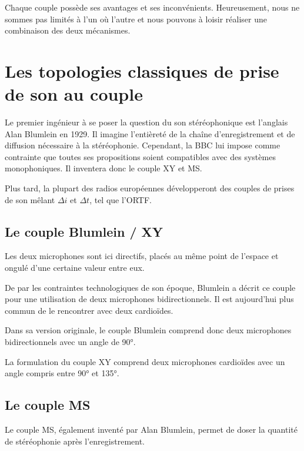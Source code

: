\documentclass[
]{book}
\begin{document}
Chaque couple possède ses avantages et ses inconvénients. Heureusement, nous ne sommes pas limités à l'un où l'autre et nous pouvons à loisir réaliser une combinaison des deux mécanismes.

\hypertarget{les-topologies-classiques-de-prise-de-son-au-couple}{%
\section{Les topologies classiques de prise de son au couple}\label{les-topologies-classiques-de-prise-de-son-au-couple}}

Le premier ingénieur à se poser la question du son stéréophonique est l'anglais Alan Blumlein en 1929. Il imagine l'entièreté de la chaîne d'enregistrement et de diffusion nécessaire à la stéréophonie. Cependant, la BBC lui impose comme contrainte que toutes ses propositions soient compatibles avec des systèmes monophoniques. Il inventera donc le couple XY et MS.

Plus tard, la plupart des radios européennes développeront des couples de prises de son mêlant \(\Delta i\) et \(\Delta t\), tel que l'ORTF.

\hypertarget{le-couple-blumlein-xy}{%
\subsection{Le couple Blumlein / XY}\label{le-couple-blumlein-xy}}

Les deux microphones sont ici directifs, placés au même point de l'espace et ongulé d'une certaine valeur entre eux.

De par les contraintes technologiques de son époque, Blumlein a décrit ce couple pour une utilisation de deux microphones bidirectionnels. Il est aujourd'hui plus commun de le rencontrer avec deux cardioïdes.

Dans sa version originale, le couple Blumlein comprend donc deux microphones bidirectionnels avec un angle de 90°.

La formulation du couple XY comprend deux microphones cardioïdes avec un angle compris entre 90° et 135°.

\hypertarget{le-couple-ms}{%
\subsection{Le couple MS}\label{le-couple-ms}}

Le couple MS, également inventé par Alan Blumlein, permet de doser la quantité de stéréophonie après l'enregistrement.
\end{document}

